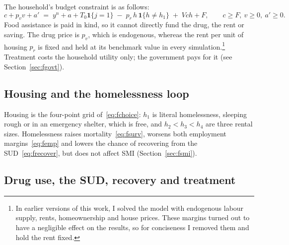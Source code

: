 \documentclass[10pt]{article}
\begin{document}
The household's budget constraint is as follows:
\begin{equation}\label{eq:fbudget}
c+p_v v+a' \;=\; y^{n}+a+T_0\mathbf{1}\{j=1\}\;-\;p_r\, h\,\mathbf{1}\{h\neq h_1\}\;+\;V\!ch+F,
\qquad c\ge F,\ v\ge0,\ a'\ge0 .
\end{equation}
Food assistance is paid in kind, so it cannot directly fund the drug, the rent or saving. The
drug price is $p_v$, which is endogenous, whereas the rent per unit of housing $p_r$ is fixed and held at its benchmark value
in every simulation.\footnote{In earlier versions of this work, I solved the model with endogenous labour supply, rents, homeownership and house prices. These margins turned out to have a negligible effect on the results, so for conciseness I removed them and hold the rent fixed.} Treatment costs the household utility only; the government pays for it (see Section~\ref{sec:fgovt}).

\subsection{Housing and the homelessness loop}

Housing is the four-point grid of~\eqref{eq:fchoice}: $h_1$ is literal
homelessness, sleeping rough or in an emergency shelter, which is free, and $h_2<h_3<h_4$
are three rental sizes. Homelessness raises mortality~\eqref{eq:fsurv}, worsens both employment margins~\eqref{eq:femp} and lowers the chance of recovering from the SUD~\eqref{eq:frecover}, but does not affect SMI (Section~\ref{sec:fsmi}).

\subsection{Drug use, the SUD, recovery and treatment}\label{sec:fdrug}
\end{document}
